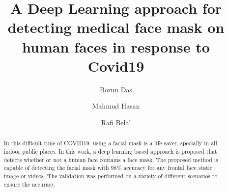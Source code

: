 \documentclass{svproc}
\begin{document}
\mainmatter              %
%
\title{A Deep Learning approach for detecting medical face mask on human faces in response to Covid19}
%
%
\author{Borun Das \and Mahmud Hasan \and Rafi Belal }
%
%
%
\maketitle              %

\begin{abstract}
In this difficult time of COVID19, using a facial mask is a life saver, specially in all indoor public places. In this work, a deep learning based approach is proposed that detects whether or not a human face contains a face mask. The proposed method is capable of detecting the facial mask with $98\%$ accuracy for any frontal face static image or videos. The validation was performed on a variety of different scenarios to ensure the accuracy.
\end{abstract}
%
\end{document}
